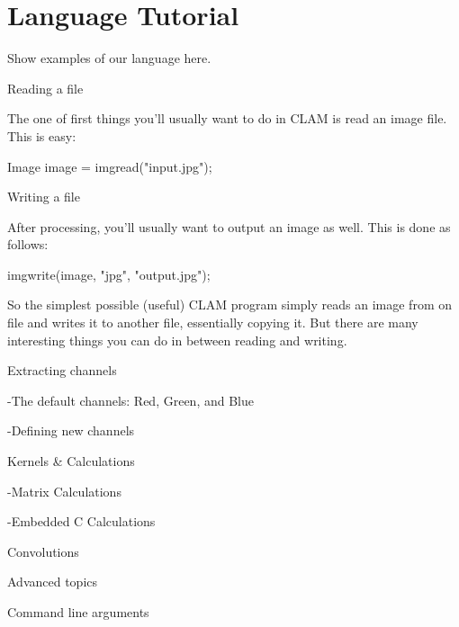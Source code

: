 \chapter{Language Tutorial}

Show examples of our language here.

Reading a file

The one of first things you'll usually want to do in CLAM is read an image file. This is easy:

Image image = imgread("input.jpg");

Writing a file

After processing, you'll usually want to output an image as well. This is done as follows:

imgwrite(image, "jpg", "output.jpg");

So the simplest possible (useful) CLAM program simply reads an image from on file and writes it to another file, essentially copying it. But there are many interesting things you can do in between reading and writing.

Extracting channels

-The default channels: Red, Green, and Blue

-Defining new channels

Kernels \& Calculations

-Matrix Calculations

-Embedded C Calculations

Convolutions

Advanced topics

Command line arguments

